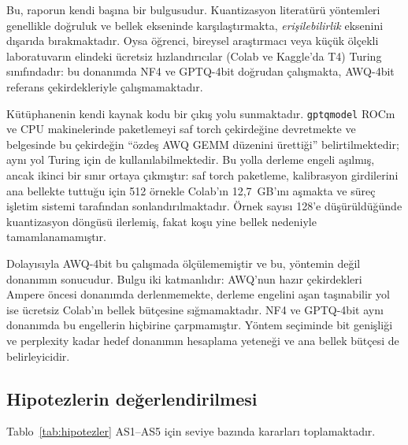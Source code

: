 \documentclass[conference]{IEEEtran}
\begin{document}
Bu, raporun kendi başına bir bulgusudur. Kuantizasyon literatürü yöntemleri
genellikle doğruluk ve bellek ekseninde karşılaştırmakta, \emph{erişilebilirlik}
eksenini dışarıda bırakmaktadır. Oysa öğrenci, bireysel araştırmacı veya küçük
ölçekli laboratuvarın elindeki ücretsiz hızlandırıcılar (Colab ve Kaggle'da
T4) Turing sınıfındadır: bu donanımda NF4 ve GPTQ-4bit doğrudan çalışmakta,
AWQ-4bit referans çekirdekleriyle çalışmamaktadır.

Kütüphanenin kendi kaynak kodu bir çıkış yolu sunmaktadır. \texttt{gptqmodel}
ROCm ve CPU makinelerinde paketlemeyi saf torch çekirdeğine devretmekte ve
belgesinde bu çekirdeğin ``özdeş AWQ GEMM düzenini ürettiği'' belirtilmektedir;
aynı yol Turing için de kullanılabilmektedir. Bu yolla derleme engeli
aşılmış, ancak ikinci bir sınır ortaya çıkmıştır: saf torch paketleme,
kalibrasyon girdilerini ana bellekte tuttuğu için 512 örnekle Colab'ın
12{,}7~GB'ını aşmakta ve süreç işletim sistemi tarafından
sonlandırılmaktadır. Örnek sayısı 128'e düşürüldüğünde kuantizasyon döngüsü
ilerlemiş, fakat koşu yine bellek nedeniyle tamamlanamamıştır.

Dolayısıyla AWQ-4bit bu çalışmada ölçülememiştir ve bu, yöntemin değil
donanımın sonucudur. Bulgu iki katmanlıdır: AWQ'nun hazır çekirdekleri
Ampere öncesi donanımda derlenmemekte, derleme engelini aşan taşınabilir yol
ise ücretsiz Colab'ın bellek bütçesine sığmamaktadır. NF4 ve GPTQ-4bit aynı
donanımda bu engellerin hiçbirine çarpmamıştır. Yöntem seçiminde bit
genişliği ve perplexity kadar hedef donanımın hesaplama yeteneği ve ana
bellek bütçesi de belirleyicidir.

\subsection{Hipotezlerin değerlendirilmesi}
\label{sec:hipotezler}

Tablo~\ref{tab:hipotezler} AS1--AS5 için seviye bazında kararları
toplamaktadır.
\end{document}
